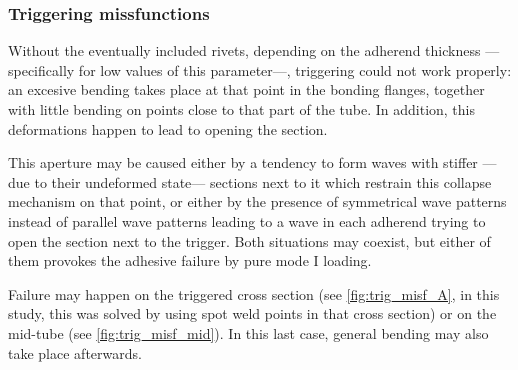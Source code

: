 \documentclass[
documentsize = a4, %
font = cmr, %
typesize = 11, %
printmode = true,
onehalfspacing = true,
language = en, %
titlepage = udciccp, %
degree = pt, %
dedication = true,
acknowledgements = true,
abstract-en = true,
abstract-es = false,
abstract-ga = false,
epigraphs = true,
toc = true,
lof = true,
lot = true,
frontmatterintoc = false,
notation = false,
minimal = false,
]{UDCthesis}
\begin{document}
\subsubsection{Triggering missfunctions}  %
\label{sec:trig_missf}

Without the eventually included rivets, depending on the adherend thickness ---specifically for low values of this parameter---, triggering could not work properly: an excesive bending takes place at that point in the bonding flanges, together with little bending on points close to that part of the tube. In addition, this deformations happen to lead to opening the section.

This aperture may be caused either by a tendency to form waves with stiffer ---due to their undeformed state--- sections next to it which restrain this collapse mechanism on that point, or either by the presence of symmetrical wave patterns instead of parallel wave patterns leading to a wave in each adherend trying to open the section next to the trigger. Both situations may coexist, but either of them provokes the adhesive failure by pure mode I loading.

Failure may happen on the triggered cross section (see \cref{fig:trig_misf_A}, in this study, this was solved by using spot weld points in that cross section) or on the mid-tube (see \cref{fig:trig_misf_mid}). In this last case, general bending may also take place afterwards.
\end{document}
